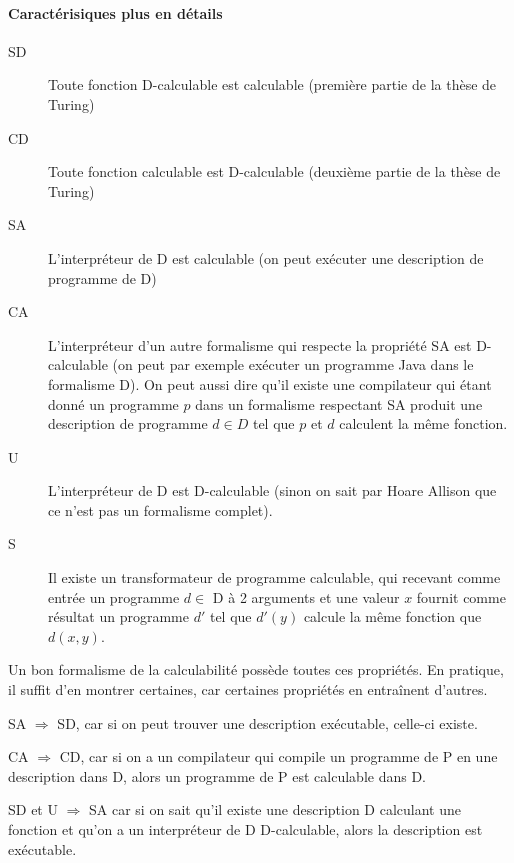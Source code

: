\paragraph{Caractérisiques plus en détails}
\begin{description}
	\item[SD]  Toute fonction D-calculable est calculable (première partie 
		de la thèse de Turing)
	\item[CD]  Toute fonction calculable est D-calculable (deuxième partie 
		de la thèse de Turing)
	\item[SA]  L'interpréteur de D est calculable (on peut exécuter une 
		description de programme de D)
	\item[CA]  L'interpréteur d'un autre formalisme qui respecte la 
		propriété SA est 
		D-calculable (on peut par exemple exécuter un programme Java 
		dans le formalisme D). On peut aussi dire qu'il existe une 
		compilateur qui étant donné un programme $p$ dans un formalisme 
		respectant SA produit une description de programme $d \in D$ tel que 
		$p$ et $d$ calculent la même fonction.
	\item[U]  L'interpréteur de D est D-calculable (sinon on sait par 
		Hoare Allison que ce n'est pas un formalisme complet).
	\item[S] Il existe un transformateur de programme calculable, qui 
		recevant comme entrée un programme $d \in$ D à 2 arguments et une valeur 
		$x$ fournit comme résultat un programme $d'$ tel que $d'(y)$ calcule 
		la même fonction que $d(x,y)$.
\end{description}
Un bon formalisme de la calculabilité possède toutes ces propriétés. En pratique, il 
suffit d'en montrer certaines, car certaines propriétés en entraînent d'autres.

\begin{myprop}
	SA $\Rightarrow$ SD, car si on peut trouver une description exécutable,
	celle-ci existe.
\end{myprop}

\begin{myprop}
	CA $\Rightarrow$ CD, car si on a un compilateur qui compile un programme 
	de P en une description dans D, alors un programme de P est calculable dans D.
\end{myprop}

\begin{myprop}
	SD et U $\Rightarrow$ SA car si on sait qu'il existe une description D calculant
	une fonction et 
qu'on a un interpréteur de D D-calculable, alors la description est exécutable.
\end{myprop}

